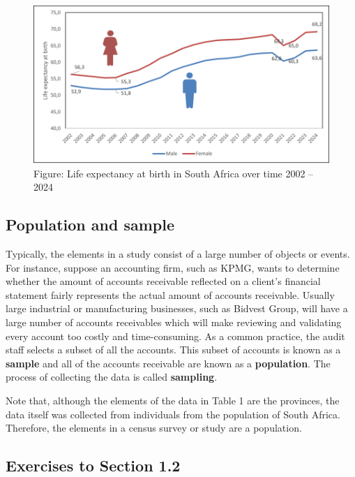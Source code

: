 \documentclass[
]{book}
\begin{document}
\begin{figure}
\centering
\includegraphics[width=5.20833in,height=\textheight]{images/clipboard-2840066963.png}
\caption{Figure: Life expectancy at birth in South Africa over time 2002 -- 2024}
\end{figure}

\subsection{Population and sample}\label{population-and-sample}

Typically, the elements in a study consist of a large number of objects or events. For instance, suppose an accounting firm, such as KPMG, wants to determine whether the amount of accounts receivable reflected on a client's financial statement fairly represents the actual amount of accounts receivable. Usually large industrial or manufacturing businesses, such as Bidvest Group, will have a large number of accounts receivables which will make reviewing and validating every account too costly and time-consuming. As a common practice, the audit staff selects a subset of all the accounts. This subset of accounts is known as a \textbf{sample} and all of the accounts receivable are known as a \textbf{population}. The process of collecting the data is called \textbf{sampling}.

Note that, although the elements of the data in Table 1 are the provinces, the data itself was collected from individuals from the population of South Africa. Therefore, the elements in a census survey or study are a population.

\subsection{Exercises to Section 1.2}\label{exercises-to-section-1.2}
\end{document}

